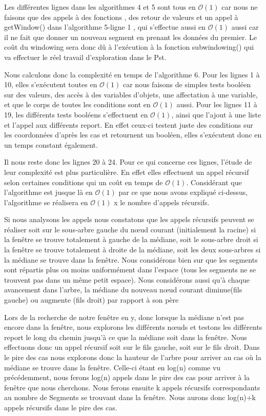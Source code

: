 \documentclass[10pt,a4paper]{article}
\begin{document}
Les différentes lignes dans les algorithmes 4 et 5 sont tous en $\mathcal{O}(1)$ car nous ne faisons que des appels à des fonctions , des retour de valeurs et un appel à getWindow() dans l'algorithme 5-ligne 1 , qui s'effectue aussi en $\mathcal{O}(1)$ aussi car il ne fait que donner un nouveau segment en prenant les données du premier. Le coût du windowing sera donc dû à l’exécution à la fonction subwindowing() qui va effectuer le réel travail d'exploration dans le Pst.

Nous calculons donc la complexité en temps de l'algorithme 6. 
Pour les lignes 1 à 10, elles s’exécutent toutes en $\mathcal{O}(1)$ car nous faisons de simples tests booléen sur des valeurs, des accès à des variables d'objets, une affectation à une variable, et que le corps de toutes les conditions sont en $\mathcal{O}(1)$ aussi.
Pour les lignes 11 à 19, les différents tests booléens s'effectuent en $\mathcal{O}(1)$, ainsi que l'ajout à une liste et l'appel aux différents report. En effet ceux-ci testent juste des conditions sur les coordonnées d'après les cas et retournent un booléen, elles s’exécutent donc en un temps constant également.

Il nous reste donc les lignes 20 à 24. Pour ce qui concerne ces lignes, l'étude de leur complexité est plus particulière. En effet elles effectuent un appel récursif selon certaines conditions qui un coût en temps de $\mathcal{O}(1)$. 
Considérant que l'algorithme est jusque là en $\mathcal{O}(1)$ par ce que nous avons expliqué ci-dessus, l'algorithme se réalisera en $\mathcal{O}(1)$ x le nombre d'appels récursifs.

Si nous analysons les appels nous constatons que les appels récursifs peuvent se réaliser soit sur le sous-arbre gauche du nœud courant (initialement la racine) si la fenêtre se trouve totalement à gauche de la médiane, soit le sous-arbre droit si la fenêtre se trouve totalement à droite de la médiane, soit les deux sous-arbres si la médiane se trouve dans la fenêtre. Nous considérons bien sur que les segments sont répartis plus ou moins uniformément dans l'espace (tous les segments ne se trouvent pas dans un même petit espace). Nous considérons aussi qu'à chaque avancement dans l'arbre, la médiane du nouveau nœud courant diminue(fils gauche) ou augmente (fils droit) par rapport à son père 

Lors de la recherche de notre fenêtre en y, donc lorsque la médiane n'est pas encore dans la fenêtre, nous explorons les différents nœuds et testons les différents report le long du chemin jusqu'à ce que la médiane soit dans la fenêtre. Nous effectuons donc un appel récursif soit sur le fils gauche, soit sur le fils droit. Dans le pire des cas nous explorons donc la hauteur de l'arbre pour arriver au cas où la médiane se trouve dans la fenêtre. Celle-ci étant en log(n) comme vu précédemment, nous ferons log(n) appels dans le pire des cas pour arriver à la fenêtre que nous cherchons. Nous ferons ensuite k appels récursifs correspondants au nombre de Segments se trouvant dans la fenêtre. Nous aurons donc log(n)+k appels récursifs dans le pire des cas.
\end{document}

